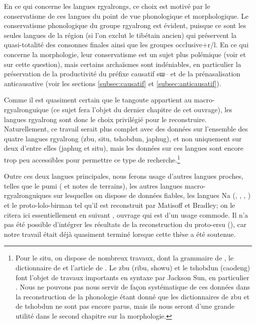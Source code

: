 \documentclass[oldfontcommands,twoside,a4paper,11pt,draft]{memoir}
\newcommand{\ipa}[1]{{\phon #1}} %
\begin{document}
En ce qui concerne les langues rgyalrongs, ce choix est motivé par le conservatisme de ces langues du point de vue phonologique et morphologique. Le conservatisme phonologique du groupe rgyalrong est évident, puisque ce sont les seules langues de la région (si l'on exclut le tibétain ancien) qui préservent la quasi-totalité des consonnes finales ainsi que les groupes occlusive+r/l. En ce qui concerne la morphologie, leur conservatisme est un sujet plus polémique (voir \citealt{jacques12agreement} et \citealt{delancey10agreement} sur cette question), mais certains archaïsmes sont indéniables, en particulier la préservation de la productivité du préfixe causatif \ipa{sɯ}-- et de la prénasalisation anticausative (voir les sections \ref{subsec:causatif} et \ref{subsec:anticausatif}).

Comme il est quasiment certain que le tangoute appartient au macro-rgyalronguique (ce sujet fera l'objet du dernier chapitre de cet ouvrage), les langues rgyalrong sont donc le choix privilégié pour le reconstruire. Naturellement, ce travail serait plus complet avec des données sur l'ensemble des quatre langues rgyalrong (zbu, situ, tshobdun, japhug), et non uniquement sur deux d'entre elles (japhug et situ), mais les données sur ces langues sont encore trop peu accessibles pour permettre ce type de recherche.\footnote{Pour le situ, on dispose de nombreux travaux, dont la grammaire de \citet{linxr93jiarong}, le dictionnaire de \citet{huangsun02} et l'article de \citet{youjing03zhuokeji}. Le zbu (ribu, showu) et le tshobdun (caodeng) font l'objet de travaux importants en syntaxe par Jackson Sun, en particulier \citet{jackson98morphology, jackson00sidaba,jackson00puxi,jackson02rentongdengdi,jackson04showu,jackson06guanxiju,jackson06paisheng,jackson07shangzhai,jackson07irrealis,sun12complementation,jackson13morpho}. Nous ne pouvons pas nous servir de façon systématique de ces données dans la reconstruction de la phonologie étant donné que les dictionnaires de zbu et de tshobdun ne sont pas encore parus, mais ils nous seront d'une grande utilité dans le second chapitre sur la morphologie.}


Outre ces deux langues principales, nous ferons usage d'autres langues proches, telles que le pumi (\citealt{lusz01pumi} et notes de terrains), les autres langues macro-rgyalronguiques sur lesquelles on dispose de données fiables, les langues Na (\citealt{boydalexis06}, \citealt{michaud06neutralisation}, \citealt{michaud08yn}, \citealt{jacques.michaud11naish}) et le proto-lolo-birman tel qu'il est reconstruit par Matisoff et Bradley; on le citera ici essentiellement en suivant \citet{bradley79}, ouvrage qui est d'un usage commode. Il n'a pas été possible d'intégrer les résultats de la reconstruction du proto-ersu (\citealt{yu12ersuic}), car notre travail était déjà quasiment terminé lorsque cette thèse a été soutenue.
\end{document}
